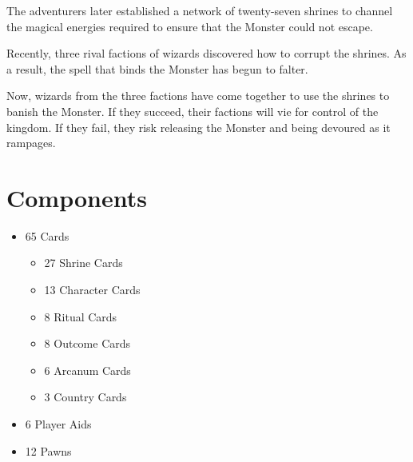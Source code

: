 \documentclass[10pt, parskip=half-, twoside]{scrartcl}
\begin{document}
The adventurers later established a network of twenty-seven shrines to channel the magical energies required to ensure that the Monster could not escape.%

Recently, three rival factions of wizards discovered how to corrupt the shrines.
As a result, the spell that binds the Monster has begun to falter.

Now, wizards from the three factions have come together to use the shrines to banish the Monster.
If they succeed, their factions will vie for control of the kingdom.
If they fail, they risk releasing the Monster and being devoured as it rampages.

\newpage

\section*{Components}
\begin{itemize}
\item 65 Cards
	\begin{itemize}
	\item 27 Shrine Cards
	\item 13 Character Cards
	\item 8 Ritual Cards
	\item 8 Outcome Cards
	\item 6 Arcanum Cards
	\item 3 Country Cards
	\end{itemize}
\item 6 Player Aids
\item 12 Pawns
\end{itemize}

\newpage
\end{document}
